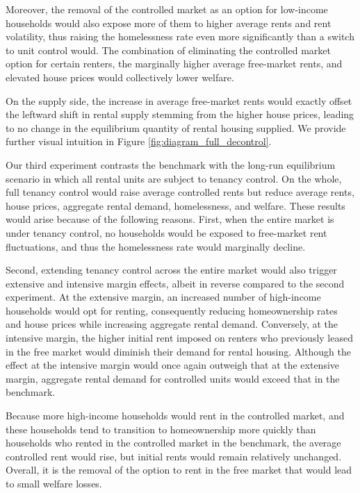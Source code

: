 \documentclass[parskip=full]{article}
\begin{document}
Moreover, the removal of the controlled market as an option for low-income households would also expose more of them to higher average rents and rent volatility, thus raising the homelessness rate even more significantly than a switch to unit control would. The combination of eliminating the controlled market option for certain renters, the marginally higher average free-market rents, and elevated house prices would collectively lower welfare. 

On the supply side, the increase in average free-market rents would exactly offset the leftward shift in rental supply stemming from the higher house prices, leading to no change in the equilibrium quantity of rental housing supplied. We provide further visual intuition in Figure \ref{fig:diagram_full_decontrol}.

Our third experiment contrasts the benchmark with the long-run equilibrium scenario in which all rental units are subject to tenancy control. On the whole, full tenancy control would raise average controlled rents but reduce average rents, house prices, aggregate rental demand, homelessness, and welfare. These results would arise because of the following reasons. First, when the entire market is under tenancy control, no households would be exposed to free-market rent fluctuations, and thus the homelessness rate would marginally decline.

Second, extending tenancy control across the entire market would also trigger extensive and intensive margin effects, albeit in reverse compared to the second experiment. At the extensive margin, an increased number of high-income households would opt for renting, consequently reducing homeownership rates and house prices while increasing aggregate rental demand. Conversely, at the intensive margin, the higher initial rent imposed on renters who previously leased in the free market would diminish their demand for rental housing. Although the effect at the intensive margin would once again outweigh that at the extensive margin, aggregate rental demand for controlled units would exceed that in the benchmark. 

Because more high-income households would rent in the controlled market, and these households tend to transition to homeownership more quickly than households who rented in the controlled market in the benchmark, the average controlled rent would rise, but initial rents would remain relatively unchanged. Overall, it is the removal of the option to rent in the free market that would lead to small welfare losses. 
\end{document}
